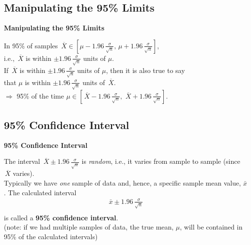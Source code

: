 \documentclass[compress]{beamer}        %
\makeatletter
\newcommand{\tcb}{\textcolor{beamer@blendedblue}}
\makeatother
\begin{document}
\subsection{Manipulating the 95\% Limits}
\begin{frame}{\bf \tcb{Manipulating the 95\% Limits}}\label{maniplims}

In 95\% of samples $\,\overline{\!X} \in [\mu-1.96\,\frac{\sigma}{\sqrt{n}},\,\mu+1.96\,\frac{\sigma}{\sqrt{n}}]$,\\[0.2cm]
i.e., $\,\overline{\!X}$ is within $\pm 1.96\,\frac{\sigma}{\sqrt{n}}$ units of $\mu$.\\[1.2cm]

If $\,\overline{\!X}$ is within $\pm 1.96\,\frac{\sigma}{\sqrt{n}}$ units of $\mu$, then it is also true to say\\[0.2cm]that $\mu$ is within $\pm 1.96\,\frac{\sigma}{\sqrt{n}}$ units of $\,\overline{\!X}$.\\[1.2cm]
$\Rightarrow$ 95\% of the time $\mu \in [\,\overline{\!X}-1.96\,\frac{\sigma}{\sqrt{n}},\,\,\overline{\!X}+1.96\,\frac{\sigma}{\sqrt{n}}]$.\\[0.5cm]

\end{frame}



\subsection{95\% Confidence Interval}
\begin{frame}{\bf \tcb{95\% Confidence Interval}}

The interval $\,\overline{\!X}\pm1.96\,\frac{\sigma}{\sqrt{n}}$ is \emph{random}, i.e., it varies from sample to sample (since $\,\overline{\!X}$ varies).\\[0.6cm]

Typically we have \emph{one} sample of data and, hence, a specific sample mean value, $\bar x$. The calculated interval\\
\begin{align*}
\boxed{\bar x \pm1.96\,\frac{\sigma}{\sqrt{n}}}\\
\end{align*}
is called a {\bf 95\% confidence interval}.\\[0.6cm]


{\footnotesize(note: if we had multiple samples of data, the true mean, $\mu$, will be contained in 95\% of the calculated intervals)}
\end{frame}
\end{document}
